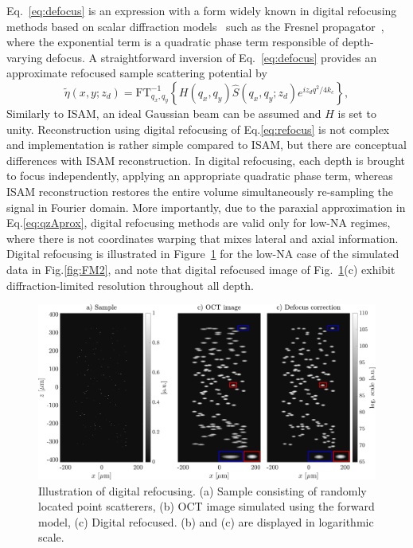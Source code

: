 Eq.~\eqref{eq:defocus} is an expression with a form widely known in digital refocusing methods based on scalar diffraction models~\cite{Ralston2005_Deconvolution, Yu2007_Improved, Liu2009_Deconvolution} such as the Fresnel propagator~\cite{Yasuno2006_Noniterative}, where the exponential term is a quadratic phase term responsible of depth-varying defocus. A straightforward inversion of Eq.~\eqref{eq:defocus} provides an approximate refocused sample scattering potential by~\cite{South2016_Computed}
\begin{equation}\label{eq:refocus}
    \tilde{\eta}(x,y; z_d) = \text{FT}^{-1}_{q_x, q_y}\left\{H(q_x, q_y)\hat{S}(q_x, q_y; z_d) e^{iz_dq^2/4k_c}\right\},
\end{equation}
Similarly to ISAM, an ideal Gaussian beam can be assumed and $H$ is set to unity. Reconstruction using digital refocusing of Eq.\eqref{eq:refocus} is not complex and implementation is rather simple compared to ISAM, but there are conceptual differences with ISAM reconstruction. In digital refocusing, each depth is brought to focus independently, applying an appropriate quadratic phase term, whereas ISAM reconstruction restores the entire volume simultaneously re-sampling the signal in Fourier domain. More importantly, due to the paraxial approximation in Eq.\eqref{eq:qzAprox}, digital refocusing methods are valid only for low-NA regimes, where there is not coordinates warping that mixes lateral and axial information. Digital refocusing is illustrated in Figure~\ref{fig:IM2} for the low-NA case of the simulated data in Fig.\ref{fig:FM2}, and note that digital refocused image of Fig.~\ref{fig:IM2}(c) exhibit diffraction-limited resolution throughout all depth.

\begin{figure}[htb!]
    \centering
    \includegraphics[width=\textwidth]{Figures/TheoreticalBasis/IM_Refocus.pdf}
    \caption{Illustration of digital refocusing. (a) Sample consisting of randomly located point scatterers, (b) OCT image simulated using the forward model, (c) Digital refocused. (b) and (c) are displayed in logarithmic scale.}
    \label{fig:IM2}
\end{figure}

